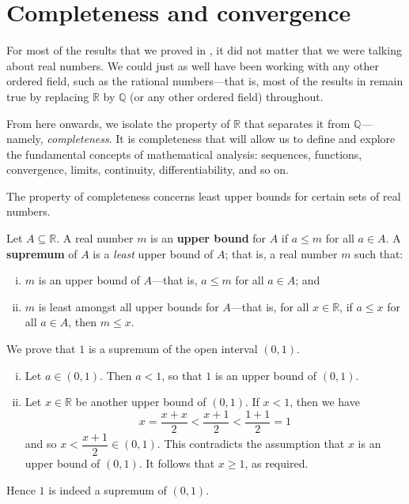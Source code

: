 \section{Completeness and convergence}

For most of the results that we proved in , it did not matter that we were talking about real numbers. We could just as well have been working with any other ordered field, such as the rational numbers---that is, most of the results in  remain true by replacing $\mathbb{R}$ by $\mathbb{Q}$ (or any other ordered field) throughout.

From here onwards, we isolate the property of $\mathbb{R}$ that separates it from $\mathbb{Q}$---namely, \textit{completeness}. It is completeness that will allow us to define and explore the fundamental concepts of mathematical analysis: sequences, functions, convergence, limits, continuity, differentiability, and so on.

The property of completeness concerns least upper bounds for certain sets of real numbers.

\begin{definition}
\label{defSupremumOfSubsetOfR}
Let $A \subseteq \mathbb{R}$. A real number $m$ is an \textbf{upper bound} for $A$ if $a \le m$ for all $a \in A$. A \textbf{supremum} of $A$ is a \textit{least} upper bound of $A$; that is, a real number $m$ such that:
\begin{enumerate}[(i)]
\item $m$ is an upper bound of $A$---that is, $a \le m$ for all $a \in A$; and
\item $m$ is least amongst all upper bounds for $A$---that is, for all $x \in \mathbb{R}$, if $a \le x$ for all $a \in A$, then $m \le x$.
\end{enumerate}
\end{definition}

\begin{example}
We prove that $1$ is a supremum of the open interval $(0,1)$.
\begin{enumerate}[(i)]
\item Let $a \in (0,1)$. Then $a < 1$, so that $1$ is an upper bound of $(0,1)$.
\item Let $x \in \mathbb{R}$ be another upper bound of $(0,1)$. If $x < 1$, then we have
\[ x = \dfrac{x+x}{2} < \dfrac{x+1}{2} < \dfrac{1+1}{2} = 1 \]
and so $x < \dfrac{x+1}{2} \in (0,1)$. This contradicts the assumption that $x$ is an upper bound of $(0,1)$. It follows that $x \ge 1$, as required.
\end{enumerate}
Hence $1$ is indeed a supremum of $(0,1)$.
\end{example}

